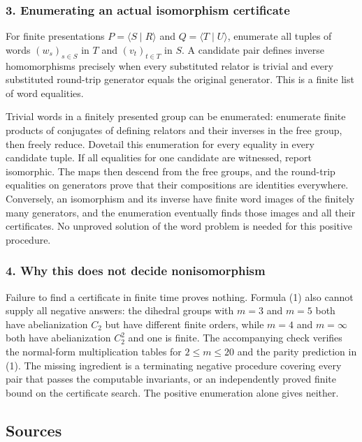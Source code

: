 \documentclass[11pt,a4paper]{article}
\begin{document}
\subsubsection{3. Enumerating an actual isomorphism certificate}
For finite presentations $P=\langle S\mid R\rangle$ and $Q=\langle T\mid U\rangle$, enumerate all tuples of words $(w_s)_{s\in S}$ in $T$ and $(v_t)_{t\in T}$ in $S$. A candidate pair defines inverse homomorphisms precisely when every substituted relator is trivial and every substituted round-trip generator equals the original generator. This is a finite list of word equalities.

Trivial words in a finitely presented group can be enumerated: enumerate finite products of conjugates of defining relators and their inverses in the free group, then freely reduce. Dovetail this enumeration for every equality in every candidate tuple. If all equalities for one candidate are witnessed, report isomorphic. The maps then descend from the free groups, and the round-trip equalities on generators prove that their compositions are identities everywhere. Conversely, an isomorphism and its inverse have finite word images of the finitely many generators, and the enumeration eventually finds those images and all their certificates. No unproved solution of the word problem is needed for this positive procedure.

\subsubsection{4. Why this does not decide nonisomorphism}
Failure to find a certificate in finite time proves nothing. Formula (1) also cannot supply all negative answers: the dihedral groups with $m=3$ and $m=5$ both have abelianization $C_2$ but have different finite orders, while $m=4$ and $m=\infty$ both have abelianization $C_2^2$ and one is finite. The accompanying check verifies the normal-form multiplication tables for $2\leq m\leq20$ and the parity prediction in (1). The missing ingredient is a terminating negative procedure covering every pair that passes the computable invariants, or an independently proved finite bound on the certificate search. The positive enumeration alone gives neither.

\subsection{Sources}
\end{document}
